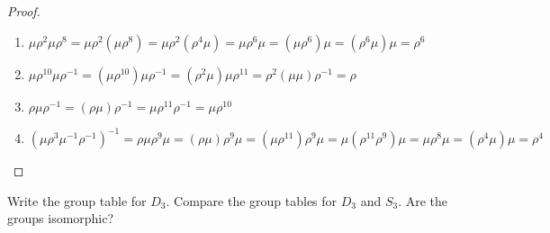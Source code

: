 \begin{proof}
    \begin{enumerate}[label={\textbf{\alph*.}}]
        \item $\mu{\rho}^{2}\mu{\rho}^{8} = \mu{\rho}^{2}(\mu{\rho}^{8}) = \mu{\rho}^{2}({\rho}^{4}\mu) = \mu{\rho}^{6}\mu = {(\mu{\rho}^{6})}\mu = {({\rho}^{6}\mu)}\mu = \rho^{6}$
        \item $\mu{\rho}^{10}\mu{\rho}^{-1} = (\mu{\rho}^{10})\mu{\rho}^{-1} = ({\rho}^{2}\mu)\mu{\rho}^{11} = {\rho}^{2}(\mu\mu){\rho}^{-1} = \rho$
        \item $\rho\mu{\rho}^{-1} = (\rho\mu){\rho}^{-1} = \mu{\rho}^{11}{\rho}^{-1} = \mu{\rho}^{10}$
        \item ${(\mu{\rho}^{3}{\mu}^{-1}{\rho}^{-1})}^{-1} = \rho\mu\rho^{9}\mu = (\rho\mu)\rho^{9}\mu = (\mu\rho^{11})\rho^{9}\mu = \mu(\rho^{11}\rho^{9})\mu = \mu{\rho}^{8}\mu = ({\rho}^{4}\mu)\mu = \rho^{4}$
    \end{enumerate}
\end{proof}

\begin{exercise}
    Write the group table for $D_{3}$. Compare the group tables for $D_{3}$ and $S_{3}$. Are the groups isomorphic?
\end{exercise}

